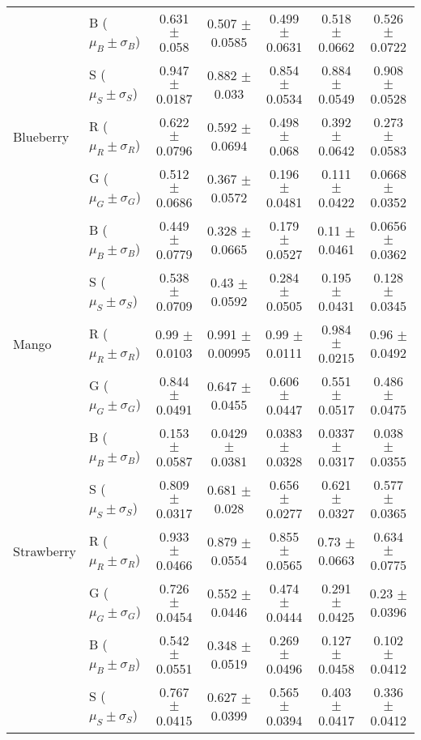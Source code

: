 \documentclass[authoryear]{elsarticle}
\begin{document}
\begin{tabular}{llccccc}
          		 & B ($\mu_B \pm \sigma_B$) & 0.631 $\pm$ 0.058 & 0.507 $\pm$ 0.0585 & 0.499 $\pm$ 0.0631 & 0.518 $\pm$ 0.0662 & 0.526 $\pm$ 0.0722 \\
          		 & S ($\mu_S \pm \sigma_S$) & 0.947 $\pm$ 0.0187 & 0.882 $\pm$ 0.033 & 0.854 $\pm$ 0.0534 & 0.884 $\pm$ 0.0549 & 0.908 $\pm$ 0.0528 \\
    \midrule
	Blueberry	 & R ($\mu_R \pm \sigma_R$) & 0.622 $\pm$ 0.0796 & 0.592 $\pm$ 0.0694 & 0.498 $\pm$ 0.068 & 0.392 $\pm$ 0.0642 & 0.273 $\pm$ 0.0583 \\
         		 & G ($\mu_G \pm \sigma_G$) & 0.512 $\pm$ 0.0686 & 0.367 $\pm$ 0.0572 & 0.196 $\pm$ 0.0481 & 0.111 $\pm$ 0.0422 & 0.0668 $\pm$ 0.0352 \\
          		 & B ($\mu_B \pm \sigma_B$) & 0.449 $\pm$ 0.0779 & 0.328 $\pm$ 0.0665 & 0.179 $\pm$ 0.0527 & 0.11 $\pm$ 0.0461 & 0.0656 $\pm$ 0.0362 \\
 				 & S ($\mu_S \pm \sigma_S$) & 0.538 $\pm$ 0.0709 & 0.43 $\pm$ 0.0592 & 0.284 $\pm$ 0.0505 & 0.195 $\pm$ 0.0431 & 0.128 $\pm$ 0.0345 \\
	\midrule
	Mango		 & R ($\mu_R \pm \sigma_R$) & 0.99 $\pm$ 0.0103 & 0.991 $\pm$ 0.00995 & 0.99 $\pm$ 0.0111 & 0.984 $\pm$ 0.0215 & 0.96 $\pm$ 0.0492 \\
         		 & G ($\mu_G \pm \sigma_G$) & 0.844 $\pm$ 0.0491 & 0.647 $\pm$ 0.0455 & 0.606 $\pm$ 0.0447 & 0.551 $\pm$ 0.0517 & 0.486 $\pm$ 0.0475 \\
          		 & B ($\mu_B \pm \sigma_B$) & 0.153 $\pm$ 0.0587 & 0.0429 $\pm$ 0.0381 & 0.0383 $\pm$ 0.0328 & 0.0337 $\pm$ 0.0317 & 0.038 $\pm$ 0.0355 \\
          		 & S ($\mu_S \pm \sigma_S$) & 0.809 $\pm$ 0.0317 & 0.681 $\pm$ 0.028 & 0.656 $\pm$ 0.0277 & 0.621 $\pm$ 0.0327 & 0.577 $\pm$ 0.0365 \\
    \midrule
	Strawberry	 & R ($\mu_R \pm \sigma_R$) & 0.933 $\pm$ 0.0466 & 0.879 $\pm$ 0.0554 & 0.855 $\pm$ 0.0565 & 0.73 $\pm$ 0.0663 & 0.634 $\pm$ 0.0775 \\
         		 & G ($\mu_G \pm \sigma_G$) & 0.726 $\pm$ 0.0454 & 0.552 $\pm$ 0.0446 & 0.474 $\pm$ 0.0444 & 0.291 $\pm$ 0.0425 & 0.23 $\pm$ 0.0396 \\
          		 & B ($\mu_B \pm \sigma_B$) & 0.542 $\pm$ 0.0551 & 0.348 $\pm$ 0.0519 & 0.269 $\pm$ 0.0496 & 0.127 $\pm$ 0.0458 & 0.102 $\pm$ 0.0412 \\
          		 & S ($\mu_S \pm \sigma_S$) & 0.767 $\pm$ 0.0415 & 0.627 $\pm$ 0.0399 & 0.565 $\pm$ 0.0394 & 0.403 $\pm$ 0.0417 & 0.336 $\pm$ 0.0412 \\
    \bottomrule
    \end{tabular}%
\end{document}
